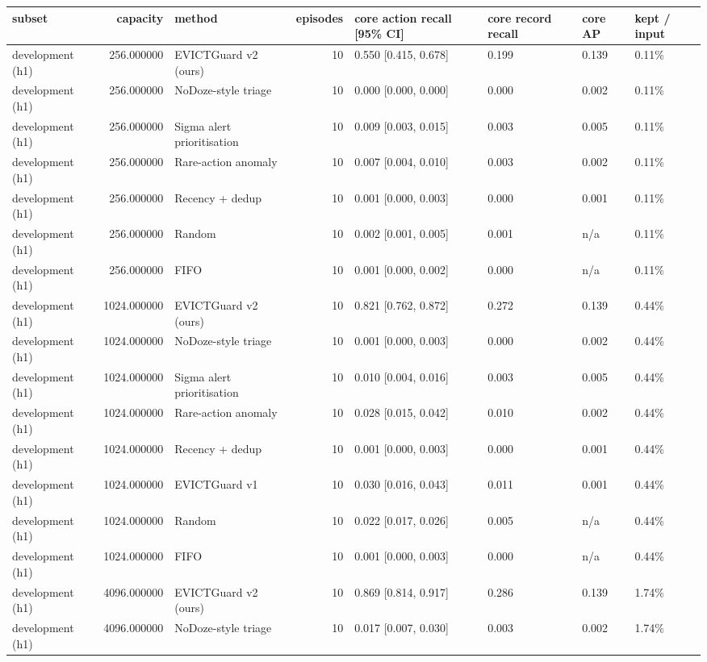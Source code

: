 \begin{tabular}{lrlrllll}
\toprule
subset & capacity & method & episodes & core action recall [95\% CI] & core record recall & core AP & kept / input \\
\midrule
development (h1) & 256.000000 & EVICTGuard v2 (ours) & 10 & 0.550 [0.415, 0.678] & 0.199 & 0.139 & 0.11\% \\
development (h1) & 256.000000 & NoDoze-style triage & 10 & 0.000 [0.000, 0.000] & 0.000 & 0.002 & 0.11\% \\
development (h1) & 256.000000 & Sigma alert prioritisation & 10 & 0.009 [0.003, 0.015] & 0.003 & 0.005 & 0.11\% \\
development (h1) & 256.000000 & Rare-action anomaly & 10 & 0.007 [0.004, 0.010] & 0.003 & 0.002 & 0.11\% \\
development (h1) & 256.000000 & Recency + dedup & 10 & 0.001 [0.000, 0.003] & 0.000 & 0.001 & 0.11\% \\
development (h1) & 256.000000 & Random & 10 & 0.002 [0.001, 0.005] & 0.001 & n/a & 0.11\% \\
development (h1) & 256.000000 & FIFO & 10 & 0.001 [0.000, 0.002] & 0.000 & n/a & 0.11\% \\
development (h1) & 1024.000000 & EVICTGuard v2 (ours) & 10 & 0.821 [0.762, 0.872] & 0.272 & 0.139 & 0.44\% \\
development (h1) & 1024.000000 & NoDoze-style triage & 10 & 0.001 [0.000, 0.003] & 0.000 & 0.002 & 0.44\% \\
development (h1) & 1024.000000 & Sigma alert prioritisation & 10 & 0.010 [0.004, 0.016] & 0.003 & 0.005 & 0.44\% \\
development (h1) & 1024.000000 & Rare-action anomaly & 10 & 0.028 [0.015, 0.042] & 0.010 & 0.002 & 0.44\% \\
development (h1) & 1024.000000 & Recency + dedup & 10 & 0.001 [0.000, 0.003] & 0.000 & 0.001 & 0.44\% \\
development (h1) & 1024.000000 & EVICTGuard v1 & 10 & 0.030 [0.016, 0.043] & 0.011 & 0.001 & 0.44\% \\
development (h1) & 1024.000000 & Random & 10 & 0.022 [0.017, 0.026] & 0.005 & n/a & 0.44\% \\
development (h1) & 1024.000000 & FIFO & 10 & 0.001 [0.000, 0.003] & 0.000 & n/a & 0.44\% \\
development (h1) & 4096.000000 & EVICTGuard v2 (ours) & 10 & 0.869 [0.814, 0.917] & 0.286 & 0.139 & 1.74\% \\
development (h1) & 4096.000000 & NoDoze-style triage & 10 & 0.017 [0.007, 0.030] & 0.003 & 0.002 & 1.74\% \\

\end{tabular}
